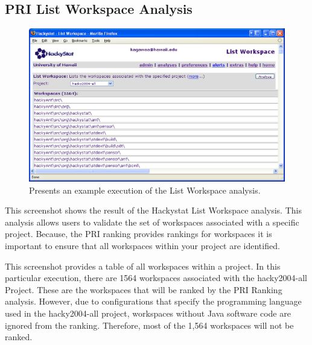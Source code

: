 \clearpage
\subsection{PRI List Workspace Analysis}
\begin{figure}[ht]
  \centering
  \includegraphics[width=1.00\textwidth]{figs/UserInterface/analysis-listWorkspace.eps}
  \caption[Execution of the List Workspace analysis]{Presents an example execution
    of the List Workspace analysis.} 
  \label{fig:analysis-listWorkspace}
\end{figure}
This screenshot shows the result of the Hackystat List Workspace analysis.
This analysis allows users to validate the set of workspaces associated
with a specific project. Because, the PRI ranking provides rankings for
workspaces it is important to ensure that all workspaces within your
project are identified.

This screenshot provides a table of all workspaces within a project. In
this particular execution, there are 1564 workspaces associated with the
hacky2004-all Project. These are the workspaces that will be ranked by the
PRI Ranking analysis. However, due to configurations that specify the
programming language used in the hacky2004-all project, workspaces without
Java software code are ignored from the ranking. Therefore, most of the
1,564 workspaces will not be ranked.

\clearpage
